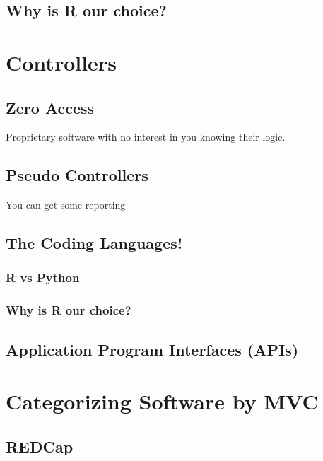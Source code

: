 \documentclass[
]{book}
\begin{document}
\section{Why is R our choice?}\label{why-is-r-our-choice}

\chapter{Controllers}\label{controllers}

\section{Zero Access}\label{zero-access}

Proprietary software with no interest in you knowing their logic.

\section{Pseudo Controllers}\label{pseudo-controllers}

You can get some reporting

\section{The Coding Languages!}\label{the-coding-languages}

\subsection{R vs Python}\label{r-vs-python}

\subsection{Why is R our choice?}\label{why-is-r-our-choice-1}

\section{Application Program Interfaces (APIs)}\label{application-program-interfaces-apis}

\chapter{Categorizing Software by MVC}\label{categorizing-software-by-mvc}

\section{REDCap}\label{redcap-1}
\end{document}

